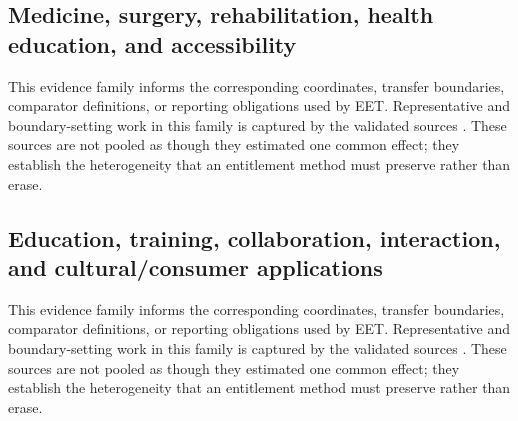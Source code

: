 \subsection{Medicine, surgery, rehabilitation, health education, and accessibility}
This evidence family informs the corresponding coordinates, transfer boundaries, comparator definitions, or reporting obligations used by EET. Representative and boundary-setting work in this family is captured by the validated sources \cite{Ahmetovic2025Artwork,Gsaxner2023HoloLensMedicine,Birlo2022OSTSurgery,Kovoor2021SurgicalEducation,Barsom2016MedicalTraining,Coughlan2017AR4VI,Gopalakrishnan2020VisualAcuity,Lang2021ButtonLowVision,Salameh2026RemoteAssistance,Li2026SpatialNeglectReview,ElAshry2026SurgicalTrainingReview,Xu2026DentalImplantMetaAnalysis,Pur2023LowVisionReview,Berenguer2020AutismAR,Ceyssens2025OlderAdultsAR,Nicolai2026NavigatedSurgery,Xiong2025LaparoscopicTraining,Yoon2018Surgeon,Bollen2022IntraoperativeAR,Williams2020SurgicalTraining,Suresh2023SurgicalTraining,Tang2020MedicalEducation,Tene2024MedicalUmbrella,RodriguezAbad2021HealthSciences,Lauinger2026XRHealthEducation,Williams2025AnatomyAR,Haq2026SurgicalTraining,Jia2025StrokeARMeta,Alashram2025StrokeLowerLimbAR,Su2024TKAExtendedReality,Plavoukou2025KneeRehabilitation,Williamson2025SCIExtendedReality,Gonzales2025NonTechnicalHealthcareXR,Asoodar2024HealthProfessionsLearning,Mondal2024IndiaHealthcareEducation,Chahartangi2025ARVirtualPatients,Roman2024HealthSciencesTeaching,Zilak2022HandheldAccessibility,PerezPachon2020ImageOverlaySurgery,Lin2016AREducationDisabilities}. These sources are not pooled as though they estimated one common effect; they establish the heterogeneity that an entitlement method must preserve rather than erase.

\subsection{Education, training, collaboration, interaction, and cultural/consumer applications}
This evidence family informs the corresponding coordinates, transfer boundaries, comparator definitions, or reporting obligations used by EET. Representative and boundary-setting work in this family is captured by the validated sources \cite{Mathew2026ARRAE,Sereno2022Collaborative,Seeliger2024ContextAdaptive,Marques2023CollaborativeEvaluation,Rasch2026SharedGaze,Yang2025SocialMind,Gurerk2025ProductivityLearning,Deng2026EgoHOIBench,Liu2026CGEducationReview,Hughes2025InteractionUX,Hertel2021InteractionTaxonomy,Bai2025GestureSpeech,Wang2021RemoteCollaborationReview,Ghamandi2023CollaborativeXR,Ramtohul2025AdaptiveMultimodal,Garzon2019LearningGains,Garzon2020Pedagogy,Zhang2022K12AR,Huang2025MixedRealityEducation,Chiang2022VocationalTraining,Burke2025XRHigherEducation,Li2025ARHigherEducationMeta,Upadhyay2024CollaborativeHigherEducation,Ramtohul2024CulturalHeritage,Chen2022ARRetail,Liang2021ARTourism,Balalle2025HigherEducationXR,Kazlaris2025CollaborativeLearning,Kumar2022OnlineRetailAR,Wang2021MultimodalInteraction,Szentirmai2024UniversallyDesignedAR}. These sources are not pooled as though they estimated one common effect; they establish the heterogeneity that an entitlement method must preserve rather than erase.

